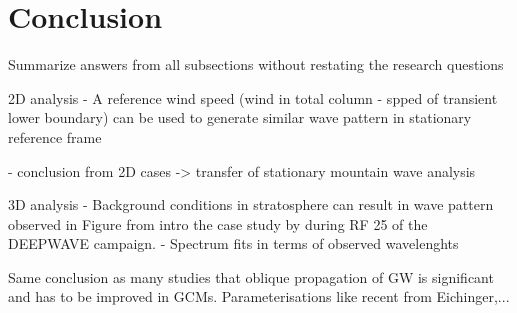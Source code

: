 \chapter{Conclusion}

Summarize answers from all subsections without restating the research questions

2D analysis
- A reference wind speed (wind in total column - spped of transient lower boundary) can be used to generate similar wave pattern in stationary reference frame

- conclusion from 2D cases -> transfer of stationary mountain wave analysis

3D analysis
- Background conditions in stratosphere can result in wave pattern observed in Figure from intro the case study by \cite{dornbrack_stratospheric_2022} during RF 25 of the DEEPWAVE campaign.
- Spectrum fits in terms of observed wavelenghts




Same conclusion as many studies that oblique propagation of GW is significant and has to be improved in GCMs. Parameterisations like recent from Eichinger,...



